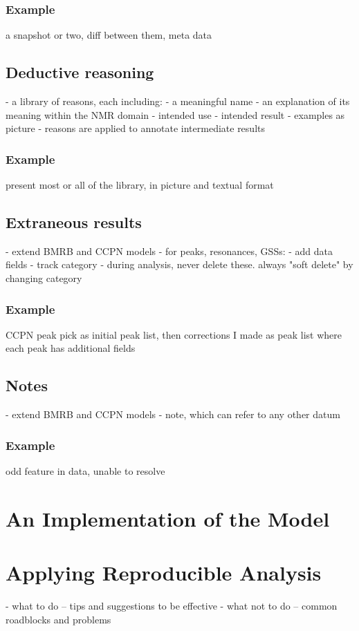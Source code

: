 \subsubsection{Example}
a snapshot or two, diff between them, meta data

\subsection{Deductive reasoning}
 - a library of reasons, each including:
   - a meaningful name
   - an explanation of its meaning within the NMR domain
   - intended use
   - intended result
   - examples as picture
 - reasons are applied to annotate intermediate results
\subsubsection{Example}
present most or all of the library, in picture and textual format

\subsection{Extraneous results}
 - extend BMRB and CCPN models
 - for peaks, resonances, GSSs:
   - add data fields
   - track category
   - during analysis, never delete these.  always "soft delete" by changing category
\subsubsection{Example}
CCPN peak pick as initial peak list, then corrections I made as peak list 
where each peak has additional fields

\subsection{Notes}
 - extend BMRB and CCPN models
 - note, which can refer to any other datum
\subsubsection{Example}
odd feature in data, unable to resolve


\section{An Implementation of the Model}


\section{Applying Reproducible Analysis}
 - what to do -- tips and suggestions to be effective
 - what not to do -- common roadblocks and problems


